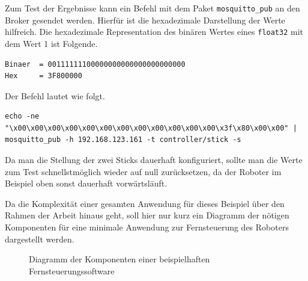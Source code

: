 Zum Test der Ergebnisse kann ein Befehl mit dem Paket \texttt{mosquitto\_pub} an den Broker gesendet werden.
Hierfür ist die hexadezimale Darstellung der Werte hilfreich.
Die hexadezimale Representation des binären Wertes eines \texttt{float32} mit dem Wert \num{1} ist Folgende.

\begin{lstlisting}
Binaer  = 00111111100000000000000000000000
Hex     = 3F800000
\end{lstlisting}

\noindent Der Befehl lautet wie folgt.

\begin{lstlisting}
echo -ne "\x00\x00\x00\x00\x00\x00\x00\x00\x00\x00\x00\x00\x3f\x80\x00\x00" | mosquitto_pub -h 192.168.123.161 -t controller/stick -s
\end{lstlisting}

\noindent Da man die Stellung der zwei Sticks dauerhaft konfiguriert, sollte man die Werte zum Test schnellstmöglich
wieder auf null zurücksetzen, da der Roboter im Beispiel oben sonst dauerhaft vorwärtsläuft.


Da die Komplexität einer gesamten Anwendung für dieses Beispiel über den Rahmen der Arbeit hinaus geht, soll hier nur kurz
ein Diagramm der nötigen Komponenten für eine minimale Anwendung zur Fernsteuerung des Roboters dargestellt werden.

\begin{figure}[h]
    \caption{Diagramm der Komponenten einer beispielhaften Fernsteuerungssoftware}\label{fig:remote}
\end{figure}

